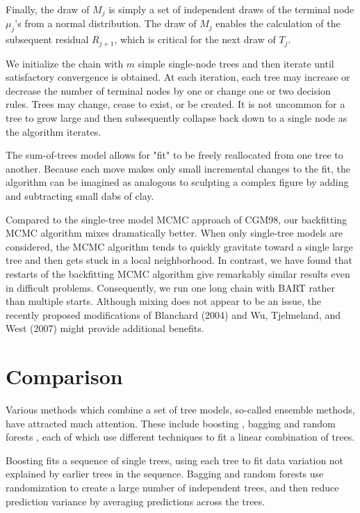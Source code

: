 \documentclass[a4paper,11pt]{article}
\begin{document}
Finally, the draw of \( M_j \) is simply a set of independent draws of the terminal node \( \mu_j \)'s from a normal distribution. The draw of \( M_j \) enables the calculation of the subsequent residual \( R_{j+1} \), which is critical for the next draw of \( T_j \). 

We initialize the chain with \( m \) simple single-node trees and then iterate until satisfactory convergence is obtained. At each iteration, each tree may increase or decrease the number of terminal nodes by one or change one or two decision rules. Trees may change, cease to exist, or be created. It is not uncommon for a tree to grow large and then subsequently collapse back down to a single node as the algorithm iterates. 

The sum-of-trees model allows for "fit" to be freely reallocated from one tree to another. Because each move makes only small incremental changes to the fit, the algorithm can be imagined as analogous to sculpting a complex figure by adding and subtracting small dabs of clay.

Compared to the single-tree model MCMC approach of CGM98, our backfitting MCMC algorithm mixes dramatically better. When only single-tree models are considered, the MCMC algorithm tends to quickly gravitate toward a single large tree and then gets stuck in a local neighborhood. In contrast, we have found that restarts of the backfitting MCMC algorithm give remarkably similar results even in difficult problems. Consequently, we run one long chain with BART rather than multiple starts. Although mixing does not appear to be an issue, the recently proposed modifications of Blanchard (2004) and Wu, Tjelmeland, and West (2007) might provide additional benefits.

\section{Comparison}
Various methods which combine a set of tree models, so-called ensemble methods, have attracted much attention. These include boosting \cite{freund1997} \cite{friedman2001}, bagging \cite{breiman1996} and random forests \cite{breiman2001}, each of which use different techniques to fit a linear combination of trees.

Boosting fits a sequence of single trees, using each tree to fit data variation not explained by earlier trees in the sequence. Bagging and random forests use randomization to create a large number of independent trees, and then reduce prediction variance by averaging predictions across the trees.
\end{document}
